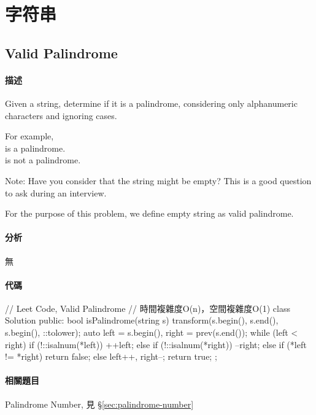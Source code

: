 \chapter{字符串}


\section{Valid Palindrome} %
\label{sec:valid-palindrome}


\subsubsection{描述}
Given a string, determine if it is a palindrome, considering only alphanumeric characters and ignoring cases.

For example,\\
 is a palindrome.\\
 is not a palindrome.

Note:
Have you consider that the string might be empty? This is a good question to ask during an interview.

For the purpose of this problem, we define empty string as valid palindrome.


\subsubsection{分析}
無


\subsubsection{代碼}
\begin{Code}
// Leet Code, Valid Palindrome
// 時間複雜度O(n)，空間複雜度O(1)
class Solution {
public:
    bool isPalindrome(string s) {
        transform(s.begin(), s.end(), s.begin(), ::tolower);
        auto left = s.begin(), right = prev(s.end());
        while (left < right) {
            if (!::isalnum(*left))  ++left;
            else if (!::isalnum(*right)) --right;
            else if (*left != *right) return false;
            else { left++, right--; }
        }
        return true;
    }
};
\end{Code}


\subsubsection{相關題目}
\begindot
\item Palindrome Number, 見 \S \ref{sec:palindrome-number}
\myenddot


